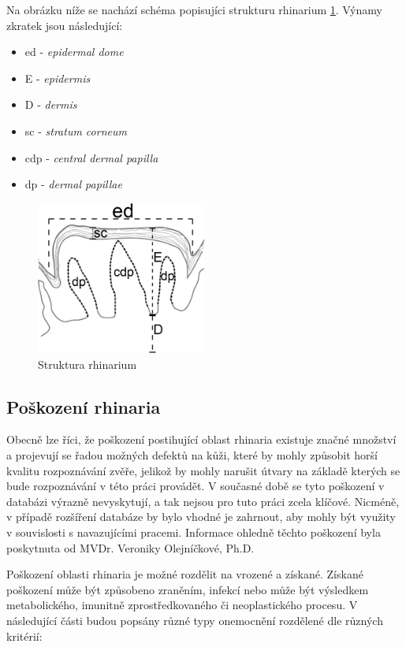 Na obrázku níže se nachází schéma popisujíci strukturu rhinarium \ref{struktura_rhinarium}. Výnamy zkratek jsou následující:
\begin{itemize}
    \item ed - \textit{epidermal dome}
    \item E - \textit{epidermis}
    \item D - \textit{dermis}
    \item sc - \textit{stratum corneum}
    \item cdp - \textit{central dermal papilla}
    \item dp - \textit{dermal papillae}
\end{itemize}

\begin{figure}[h]
	\centering
	\includegraphics[width=0.5\textwidth]{obrazky/strucureRhinarium.jpg}
	\caption{Struktura rhinarium \cite{structureRhinarium}}
	\label{struktura_rhinarium}
\end{figure}


\subsection{Poškození rhinaria}
\label{poskozeni_rhinaria}
Obecně lze říci, že poškození postihující oblast rhinaria existuje značné množství a projevují se řadou možných defektů na kůži, které by mohly způsobit horší kvalitu rozpoznávání zvěře, jelikož by mohly narušit útvary na základě kterých se bude rozpoznávání v této práci provádět. V současné době se tyto poškození v databázi výrazně nevyskytují, a tak nejsou pro tuto práci zcela klíčové. Nicméně, v případě rozšíření databáze by bylo vhodné je zahrnout, aby mohly být využity v souvislosti s navazujícími pracemi. Informace ohledně těchto poškození byla poskytnuta od MVDr. Veroniky Olejníčkové, Ph.D.

Poškození oblasti rhinaria je možné rozdělit na vrozené a získané. Získané poškození může být způsobeno zraněním, infekcí nebo může být výsledkem metabolického, imunitně zprostředkovaného či neoplastického procesu. V následující části budou popsány různé typy onemocnění rozdělené dle různých kritérií:

